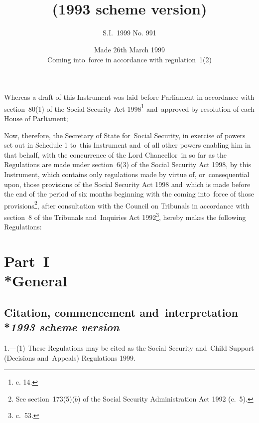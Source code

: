 \documentclass[12pt,a4paper]{article}
\title{\regstitle\\(1993 scheme version)}
\title{\regstitle}
\author{S.I.~1999 No. 991}
\date{Made 26th March 1999\\Coming into~force in accordance with regulation~1(2)}
\begin{document}
\maketitle

\noindent
Whereas a draft of this Instrument was laid before Parliament in accordance with section~80(1) of the Social Security Act 1998\footnote{ c. 14.} and~approved by resolution of each House of Parliament;

 Now, therefore, the Secretary of State for~Social Security, in exercise of powers set out in Schedule 1 to~this Instrument and~of all other powers enabling him in that behalf, with the concurrence of the Lord Chancellor~in so far as the Regulations are made under section~6(3) of the Social Security Act 1998, by this Instrument, which contains only regulations made by virtue of, or~consequential upon, those provisions of the Social Security Act 1998 and~which is made before the end of the period of six months beginning with the coming into~force of those provisions\footnote{\frenchspacing See section~173(5)($b$) of the Social Security Administration Act 1992 (c.~5).}, after consultation with the Council on Tribunals in accordance with section~8 of the Tribunals and~Inquiries Act 1992\footnote{ c.~53.}, hereby makes the following Regulations:

{\sloppy

\tableofcontents

}

\bigskip

\setcounter{secnumdepth}{-2}

\section[Part~I --- General]{Part~I\\*General}

\renewcommand\parthead{--- Part~I}

\subsection[1. Citation, commencement and~interpretation --- \emph{1993 scheme version}]{Citation, commencement and~interpretation\\*\emph{1993 scheme version}}

1.—(1) These Regulations may be cited as the Social Security and~Child Support (Decisions and~Appeals) Regulations 1999.
\end{document}
